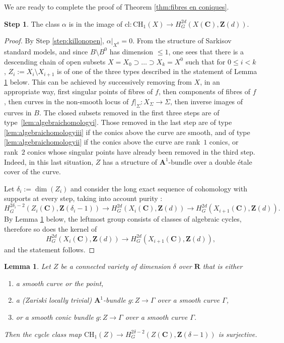 \documentclass[JEP,XML,SOM,Unicode]{cedram}
\theoremstyle{plain}
\newtheorem{lem}[thm]{Lemma}
\theoremstyle{definition}
\newtheorem{Step}{Step}
\numberwithin{equation}{section}
\newcommand{\cl}{{\mathrm{cl}}}
\newcommand{\A}{{\mathbf A}}
\renewcommand{\C}{{\mathbf C}}
\newcommand{\R}{{\mathbf R}}
\newcommand{\Z}{{\mathbf Z}}
\newcommand{\CH}{\mathrm{CH}}
\begin{document}
We are ready to complete the proof of Theorem \ref{thm:fibres en coniques}.

\begin{Step}
\label{step:removestuff}
The class $\alpha$ is in the image of $\cl:\CH_1(X)\to H^{2d}_G(X(\C),\Z(d))$.
\end{Step}

\begin{proof}
By Step \ref{step:killonopen}, $\alpha|_{X^0}=0$.
From the structure of Sarkisov standard models, and since $B\setminus B^0$ has dimension $\leq 1$, one sees that there is a descending chain of open subsets $X=X_0\supset\dots \supset X_k=X^0$ such that for $0\leq i<k$, $Z_i:=X_i\setminus X_{i+1}$ is of one of the three types described in the statement of Lemma \ref{lem:algebraichomology} below. This can be achieved by successively removing from $X$, in an appropriate way, first singular points of fibres of $f$, then components of fibres of $f$, then curves in the non-smooth locus of $f|_{\Sigma}:X_{\Sigma}\to\Sigma$, then inverse images of curves in $B$.
The closed subsets removed in the first three steps are of type~\eqref{lem:algebraichomologyi}. Those removed in the last step are of type \eqref{lem:algebraichomologyiii} if the conics above the curve are smooth, and of type \eqref{lem:algebraichomologyii} if the conics above the curve are rank~$1$ conics, or rank~$2$ conics whose singular points have already been removed in the third step. Indeed, in this last situation, $Z$ has a structure of $\A^1$-bundle over a double étale cover of the curve.

Let $\delta_i:=\dim(Z_i)$ and consider the long exact sequence of cohomology with supports at every step, taking into account purity \cite[(\ref*{BW1-eq:equivariant purity subvariety})]{BW1}:
\[
H^{2\delta_i-2}_G(Z_i(\C),\Z(\delta_i-1))\to H^{2d}_G(X_i(\C),\Z(d))\to H^{2d}_G(X_{i+1}(\C),\Z(d)).
\]
By Lemma \ref{lem:algebraichomology} below,
the leftmost group consists of classes of algebraic cycles, therefore so does the
kernel of
\[
H^{2d}_G(X_i(\C),\Z(d))\to H^{2d}_G(X_{i+1}(\C),\Z(d)),
\]
and the statement follows.
\end{proof}

\begin{lem}
\label{lem:algebraichomology}
Let $Z$ be a connected variety of dimension $\delta$ over $\R$ that is either
\begin{enumerate}
\item\label{lem:algebraichomologyi} a smooth curve or the point,
\item\label{lem:algebraichomologyii} a (Zariski locally trivial) $\A^1$-bundle $g:Z\to \Gamma$ over a smooth curve $\Gamma$,
\item\label{lem:algebraichomologyiii} or a smooth conic bundle $g:Z\to \Gamma$ over a smooth curve $\Gamma$.
\end{enumerate}
Then the cycle class map $\CH_1(Z)\to H^{2\delta-2}_{G}(Z(\C),\Z(\delta-1))$ is surjective.
\end{lem}
\end{document}
